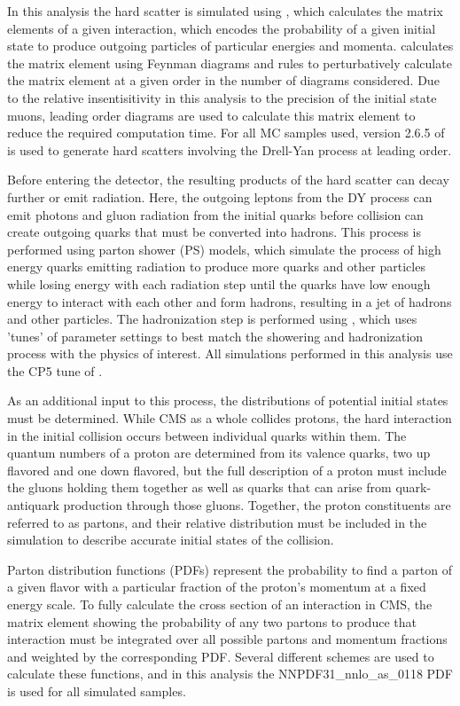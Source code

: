 In this analysis the hard scatter is simulated using \mg, which calculates the matrix elements of a given interaction, which encodes the probability of a given initial state to produce outgoing particles of particular energies and momenta.
\mg calculates the matrix element using Feynman diagrams and rules to perturbatively calculate the matrix element at a given order in the number of diagrams considered.
Due to the relative insentisitivity in this analysis to the precision of the initial state muons, leading order diagrams are used to calculate this matrix element to reduce the required computation time.
For all MC samples used, version 2.6.5 of \mg is used to generate hard scatters involving the Drell-Yan process at leading order. 

Before entering the detector, the resulting products of the hard scatter can decay further or emit radiation.
Here, the outgoing leptons from the DY process can emit photons and gluon radiation from the initial quarks before collision can create outgoing quarks that must be converted into hadrons. 
This process is performed using parton shower (PS) models, which simulate the process of high energy quarks emitting radiation to produce more quarks and other particles while losing energy with each radiation step until the quarks have low enough energy to interact with each other and form hadrons, resulting in a jet of hadrons and other particles.
The hadronization step is performed using \pythia, which uses 'tunes' of parameter settings to best match the showering and hadronization process with the physics of interest. 
All simulations performed in this analysis use the CP5 tune of \pythia \cite{pythia_tune}. 

As an additional input to this process, the distributions of potential initial states must be determined.
While CMS as a whole collides protons, the hard interaction in the initial collision occurs between individual quarks within them.
The quantum numbers of a proton are determined from its valence quarks, two up flavored and one down flavored, but the full description of a proton must include the gluons holding them together as well as quarks that can arise from quark-antiquark production through those gluons. 
Together, the proton constituents are referred to as partons, and their relative distribution must be included in the simulation to describe accurate initial states of the collision.

Parton distribution functions (PDFs) represent the probability to find a parton of a given flavor with a particular fraction of the proton's momentum at a fixed energy scale.
To fully calculate the cross section of an interaction in CMS, the matrix element showing the probability of any two partons to produce that interaction must be integrated over all possible partons and momentum fractions and weighted by the corresponding PDF. 
Several different schemes are used to calculate these functions, and in this analysis the NNPDF31_nnlo_as_0118 PDF \cite{nnpdf} is used for all simulated samples.

